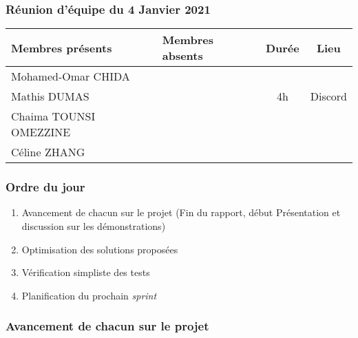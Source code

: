 


% 
\subsubsection*{\large{Réunion d'équipe du 4 Janvier 2021}}
\begin{center}
\begin{tabular}{| l | l || c | c |}
    \hline
    Membres présents & Membres absents & Durée & Lieu \\
    \hline
    Mohamed-Omar CHIDA & & & \\ Mathis DUMAS & & 4h & Discord \\ Chaima TOUNSI OMEZZINE & & & \\ Céline ZHANG & & & \\
    \hline
\end{tabular}
\end{center}

\subsubsection*{Ordre du jour}
\begin{enumerate}
    \item Avancement de chacun sur le projet (Fin du rapport, début Présentation et discussion sur les démonstrations)
    \item Optimisation des solutions proposées
    \item Vérification simpliste des tests
    \item Planification du prochain \textsl{sprint}
\end{enumerate}

\subsubsection*{Avancement de chacun sur le projet}
